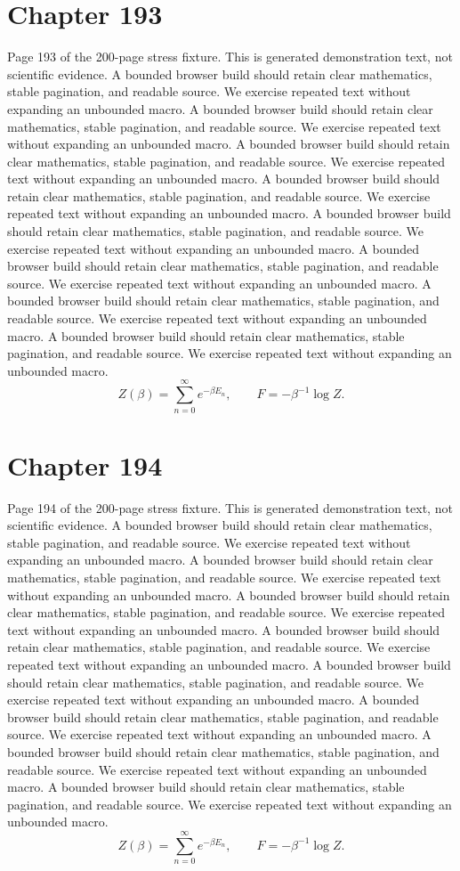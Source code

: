 \documentclass[11pt]{article}
\begin{document}
\section*{Chapter 193}
Page 193 of the 200-page stress fixture. This is generated demonstration text, not scientific evidence.
A bounded browser build should retain clear mathematics, stable pagination, and readable source. We exercise repeated text without expanding an unbounded macro.
A bounded browser build should retain clear mathematics, stable pagination, and readable source. We exercise repeated text without expanding an unbounded macro.
A bounded browser build should retain clear mathematics, stable pagination, and readable source. We exercise repeated text without expanding an unbounded macro.
A bounded browser build should retain clear mathematics, stable pagination, and readable source. We exercise repeated text without expanding an unbounded macro.
A bounded browser build should retain clear mathematics, stable pagination, and readable source. We exercise repeated text without expanding an unbounded macro.
A bounded browser build should retain clear mathematics, stable pagination, and readable source. We exercise repeated text without expanding an unbounded macro.
A bounded browser build should retain clear mathematics, stable pagination, and readable source. We exercise repeated text without expanding an unbounded macro.
A bounded browser build should retain clear mathematics, stable pagination, and readable source. We exercise repeated text without expanding an unbounded macro.
\[Z(\beta)=\sum_{n=0}^{\infty}e^{-\beta E_n},\qquad F=-\beta^{-1}\log Z.\]
\newpage
\section*{Chapter 194}
Page 194 of the 200-page stress fixture. This is generated demonstration text, not scientific evidence.
A bounded browser build should retain clear mathematics, stable pagination, and readable source. We exercise repeated text without expanding an unbounded macro.
A bounded browser build should retain clear mathematics, stable pagination, and readable source. We exercise repeated text without expanding an unbounded macro.
A bounded browser build should retain clear mathematics, stable pagination, and readable source. We exercise repeated text without expanding an unbounded macro.
A bounded browser build should retain clear mathematics, stable pagination, and readable source. We exercise repeated text without expanding an unbounded macro.
A bounded browser build should retain clear mathematics, stable pagination, and readable source. We exercise repeated text without expanding an unbounded macro.
A bounded browser build should retain clear mathematics, stable pagination, and readable source. We exercise repeated text without expanding an unbounded macro.
A bounded browser build should retain clear mathematics, stable pagination, and readable source. We exercise repeated text without expanding an unbounded macro.
A bounded browser build should retain clear mathematics, stable pagination, and readable source. We exercise repeated text without expanding an unbounded macro.
\[Z(\beta)=\sum_{n=0}^{\infty}e^{-\beta E_n},\qquad F=-\beta^{-1}\log Z.\]
\newpage
\end{document}
